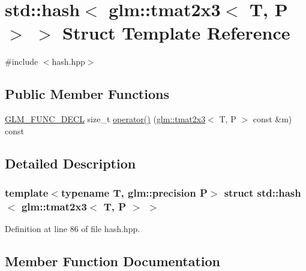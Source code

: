 \hypertarget{structstd_1_1hash_3_01glm_1_1tmat2x3_3_01_t_00_01_p_01_4_01_4}{}\section{std\+::hash$<$ glm\+::tmat2x3$<$ T, P $>$ $>$ Struct Template Reference}
\label{structstd_1_1hash_3_01glm_1_1tmat2x3_3_01_t_00_01_p_01_4_01_4}


{\ttfamily \#include $<$hash.\+hpp$>$}

\subsection*{Public Member Functions}
\begin{DoxyCompactItemize}
\item 
\mbox{\hyperlink{setup_8hpp_ab2d052de21a70539923e9bcbf6e83a51}{G\+L\+M\+\_\+\+F\+U\+N\+C\+\_\+\+D\+E\+CL}} size\+\_\+t \mbox{\hyperlink{structstd_1_1hash_3_01glm_1_1tmat2x3_3_01_t_00_01_p_01_4_01_4_aedb29189bf31b4deaf354b9939a06963}{operator()}} (\mbox{\hyperlink{structglm_1_1tmat2x3}{glm\+::tmat2x3}}$<$ T, P $>$ const \&m) const
\end{DoxyCompactItemize}


\subsection{Detailed Description}
\subsubsection*{template$<$typename T, glm\+::precision P$>$\newline
struct std\+::hash$<$ glm\+::tmat2x3$<$ T, P $>$ $>$}



Definition at line 86 of file hash.\+hpp.



\subsection{Member Function Documentation}
\mbox{\label{structstd_1_1hash_3_01glm_1_1tmat2x3_3_01_t_00_01_p_01_4_01_4_aedb29189bf31b4deaf354b9939a06963}} 
